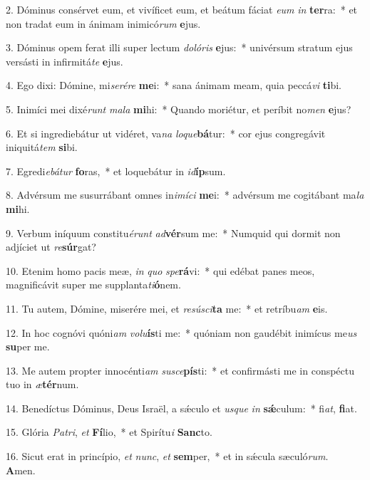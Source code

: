 2. Dóminus consérvet eum, et vivíficet eum, et beátum fáciat \textit{e}\textit{um} \textit{in} \textbf{ter}ra:~*  et non tradat eum in ánimam inimicó\textit{rum} \textbf{e}jus.\

3. Dóminus opem ferat illi super lectum \textit{do}\textit{ló}\textit{ris} \textbf{e}jus:~*  univérsum stratum ejus versásti in infirmitá\textit{te} \textbf{e}jus.\

4. Ego dixi: Dómine, mi\textit{se}\textit{ré}\textit{re} \textbf{me}i:~*  sana ánimam meam, quia peccá\textit{vi} \textbf{ti}bi.\

5. Inimíci mei dixé\textit{runt} \textit{ma}\textit{la} \textbf{mi}hi:~*  Quando moriétur, et períbit no\textit{men} \textbf{e}jus?\

6. Et si ingrediebátur ut vidéret, va\textit{na} \textit{lo}\textit{que}\textbf{bá}tur:~*  cor ejus congregávit iniquitá\textit{tem} \textbf{si}bi.\

7. Egredi\textit{e}\textit{bá}\textit{tur} \textbf{fo}ras,~*  et loquebátur in \textit{id}\textbf{íp}sum.\

8. Advérsum me susurrábant omnes in\textit{i}\textit{mí}\textit{ci} \textbf{me}i:~*  advérsum me cogitábant ma\textit{la} \textbf{mi}hi.\

9. Verbum iníquum constitu\textit{é}\textit{runt} \textit{ad}\textbf{vér}sum me:~*  Numquid qui dormit non adjíciet ut \textit{re}\textbf{súr}gat?\

10. Etenim homo pacis meæ, \textit{in} \textit{quo} \textit{spe}\textbf{rá}vi:~*  qui edébat panes meos, magnificávit super me supplanta\textit{ti}\textbf{ó}nem.\

11. Tu autem, Dómine, miserére mei, et \textit{re}\textit{sú}\textit{sci}\textbf{ta} me:~*  et retríbu\textit{am} \textbf{e}is.\

12. In hoc cognóvi quóni\textit{am} \textit{vo}\textit{lu}\textbf{ís}ti me:~*  quóniam non gaudébit inimícus me\textit{us} \textbf{su}per me.\

13. Me autem propter innocénti\textit{am} \textit{su}\textit{sce}\textbf{pís}ti:~*  et confirmásti me in conspéctu tuo in \textit{æ}\textbf{tér}num.\

14. Benedíctus Dóminus, Deus Israël, a sǽculo et \textit{us}\textit{que} \textit{in} \textbf{sǽ}culum:~*  fi\textit{at}, \textbf{fi}at.\

15. Glória \textit{Pa}\textit{tri}, \textit{et} \textbf{Fí}lio,~*  et Spirítu\textit{i} \textbf{Sanc}to.\

16. Sicut erat in princípio, \textit{et} \textit{nunc}, \textit{et} \textbf{sem}per,~*  et in sǽcula sæculó\textit{rum}. \textbf{A}men.\

